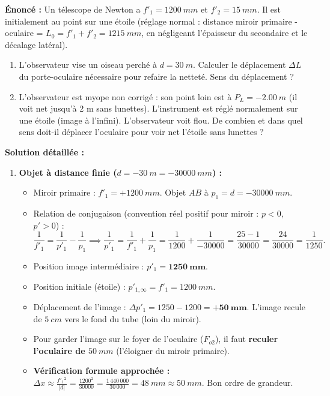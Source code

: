 \documentclass[11pt]{article}
\begin{document}
\begin{exoresolu}
\textbf{Énoncé :} Un télescope de Newton a $f'_1 = \SI{1200}{mm}$ et $f'_2 = \SI{15}{mm}$. Il est initialement au point sur une étoile (réglage normal : distance miroir primaire - oculaire = $L_0 = f'_1 + f'_2 = \SI{1215}{mm}$, en négligeant l'épaisseur du secondaire et le décalage latéral).
\begin{enumerate}
    \item L'observateur vise un oiseau perché à $d = \SI{30}{m}$. Calculer le déplacement $\Delta L$ du porte-oculaire nécessaire pour refaire la netteté. Sens du déplacement ?
    \item L'observateur est myope non corrigé : son point loin est à $P_L = -\SI{2,00}{m}$ (il voit net jusqu'à 2 m sans lunettes). L'instrument est réglé normalement sur une étoile (image à l'infini). L'observateur voit flou. De combien et dans quel sens doit-il déplacer l'oculaire pour voir net l'étoile sans lunettes ?
\end{enumerate}
\tcblower
\textbf{Solution détaillée :}
\begin{enumerate}
    \item \textbf{Objet à distance finie ($d = -\SI{30}{m} = -\SI{30000}{mm}$) :}
    \begin{itemize}
        \item Miroir primaire : $f'_1 = +\SI{1200}{mm}$. Objet $AB$ à $p_1 = d = -\SI{30000}{mm}$.
        \item Relation de conjugaison (convention réel positif pour miroir : $p<0$, $p'>0$) :
        \[
        \frac{1}{f'_1} = \frac{1}{p'_1} - \frac{1}{p_1} \implies \frac{1}{p'_1} = \frac{1}{f'_1} + \frac{1}{p_1} = \frac{1}{1200} + \frac{1}{-30000} = \frac{25 - 1}{30000} = \frac{24}{30000} = \frac{1}{1250}.
        \]
        \item Position image intermédiaire : $p'_1 = \mathbf{\SI{1250}{mm}}$.
        \item Position initiale (étoile) : $p'_{1,\infty} = f'_1 = \SI{1200}{mm}$.
        \item Déplacement de l'image : $\Delta p'_1 = 1250 - 1200 = \mathbf{+\SI{50}{mm}}$. L'image recule de $\SI{5}{cm}$ vers le fond du tube (loin du miroir).
        \item Pour garder l'image sur le foyer de l'oculaire ($F_{o2}$), il faut \textbf{reculer l'oculaire de $\SI{50}{mm}$} (l'éloigner du miroir primaire).
        \item \textbf{Vérification formule approchée :} $\Delta x \approx \frac{f'_1{}^2}{|d|} = \frac{1200^2}{30000} = \frac{1\,440\,000}{30\,000} = \SI{48}{mm} \approx \SI{50}{mm}$. Bon ordre de grandeur.

\end{itemize}
\end{enumerate}
\end{exoresolu}
\end{document}
